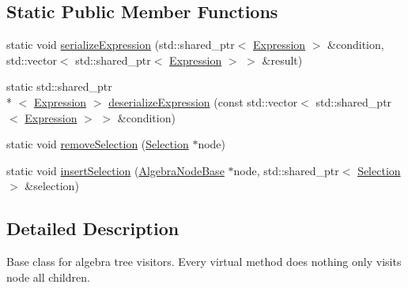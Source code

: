 \subsection*{Static Public Member Functions}
\begin{DoxyCompactItemize}
\item 
static void \hyperlink{class_algebra_visitor_aa8f4149dca3babdefa323050bb6e82f9}{serialize\+Expression} (std\+::shared\+\_\+ptr$<$ \hyperlink{class_expression}{Expression} $>$ \&condition, std\+::vector$<$ std\+::shared\+\_\+ptr$<$ \hyperlink{class_expression}{Expression} $>$ $>$ \&result)
\item 
static std\+::shared\+\_\+ptr\\*
$<$ \hyperlink{class_expression}{Expression} $>$ \hyperlink{class_algebra_visitor_a20d1215ba30361d19d0317a939a9b860}{deserialize\+Expression} (const std\+::vector$<$ std\+::shared\+\_\+ptr$<$ \hyperlink{class_expression}{Expression} $>$ $>$ \&condition)
\item 
static void \hyperlink{class_algebra_visitor_a78119cf006ac64137b8c29223ab77885}{remove\+Selection} (\hyperlink{class_selection}{Selection} $\ast$node)
\item 
static void \hyperlink{class_algebra_visitor_adbcb61f031cfc4808d150b076f6aa63d}{insert\+Selection} (\hyperlink{class_algebra_node_base}{Algebra\+Node\+Base} $\ast$node, std\+::shared\+\_\+ptr$<$ \hyperlink{class_selection}{Selection} $>$ \&selection)
\end{DoxyCompactItemize}


\subsection{Detailed Description}
Base class for algebra tree visitors. Every virtual method does nothing only visits node all children. 

